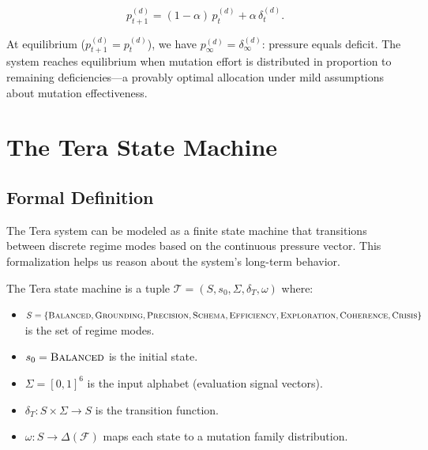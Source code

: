 \begin{equation}
p_{t+1}^{(d)} = (1-\alpha)\, p_t^{(d)} + \alpha\, \delta_t^{(d)}.
\label{eq:thermostat}
\end{equation}

At equilibrium ($p_{t+1}^{(d)} = p_t^{(d)}$), we have $p_{\infty}^{(d)} = \delta_{\infty}^{(d)}$: pressure equals deficit. The system reaches equilibrium when mutation effort is distributed in proportion to remaining deficiencies---a provably optimal allocation under mild assumptions about mutation effectiveness.

\section{The Tera State Machine}
\label{sec:tera-state-machine}

\subsection{Formal Definition}

The Tera system can be modeled as a finite state machine that transitions between discrete regime modes based on the continuous pressure vector. This formalization helps us reason about the system's long-term behavior.

\begin{dogmadef}
The Tera state machine is a tuple $\mathcal{T} = (S, s_0, \Sigma, \delta_T, \omega)$ where:
\begin{itemize}[leftmargin=1.5em]
  \item $S = \{\textsc{Balanced}, \textsc{Grounding}, \textsc{Precision}, \textsc{Schema}, \textsc{Efficiency}, \textsc{Exploration}, \textsc{Coherence}, \textsc{Crisis}\}$ is the set of regime modes.
  \item $s_0 = \textsc{Balanced}$ is the initial state.
  \item $\Sigma = [0,1]^6$ is the input alphabet (evaluation signal vectors).
  \item $\delta_T : S \times \Sigma \to S$ is the transition function.
  \item $\omega : S \to \Delta(\mathcal{F})$ maps each state to a mutation family distribution.
\end{itemize}
\end{dogmadef}

